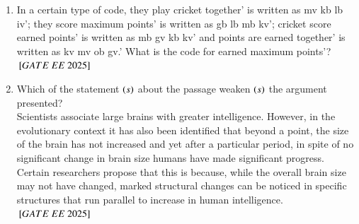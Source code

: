 \documentclass[journal,12pt,onecolumn]{IEEEtran}
\theoremstyle{remark}
\begin{document}
\begin{enumerate}
   \item In a certain type of code, they play cricket together' is written as mv kb lb iv'; they score maximum points' is written as gb lb mb kv'; cricket score earned points' is written as mb gv kb kv' and points are earned together' is written as kv mv ob gv.' 
What is the code for earned maximum points'?
\\   
\hfill ${}\left[GATE\ EE\ 2025\right]$
    \begin{enumerate}
      \end{enumerate}

  \item Which of the statement $\left(s\right)$ about the passage weaken $\left(s\right)$ the argument presented? \\
Scientists associate large brains with greater intelligence. However, in the evolutionary context it has also been identified that beyond a point, the size of the brain has not increased and yet after a particular period, in spite of no significant change in brain size humans have made significant progress. Certain researchers propose that this is because, while the overall brain size may not have changed, marked structural changes can be noticed in specific structures that run parallel to increase in human intelligence. \\   
\hfill ${}\left[GATE\ EE\ 2025\right]$
    \begin{enumerate}
      \end{enumerate}


\end{enumerate}
\end{document}
